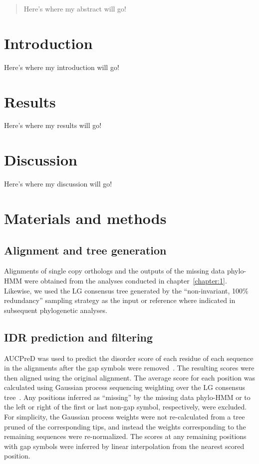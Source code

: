 \begin{abstract}
\noindent
Here's where my abstract will go!
\end{abstract}

\section{Introduction}
Here's where my introduction will go!

\section{Results}
Here's where my results will go!

\section{Discussion}
Here's where my discussion will go!

\section{Materials and methods}

\subsection{Alignment and tree generation}
Alignments of single copy orthologs and the outputs of the missing data phylo-HMM were obtained from the analyses conducted in chapter~\ref{chapter:1}. Likewise, we used the LG consensus tree generated by the ``non-invariant, 100\% redundancy'' sampling strategy as the input or reference where indicated in subsequent phylogenetic analyses.

\subsection{IDR prediction and filtering}
AUCPreD was used to predict the disorder score of each residue of each sequence in the alignments after the gap symbols were removed~\cite{Wang2016}. The resulting scores were then aligned using the original alignment. The average score for each position was calculated using Gaussian process sequencing weighting over the LG consensus tree~\cite{Altschul1989}. Any positions inferred as ``missing'' by the missing data phylo-HMM or to the left or right of the first or last non-gap symbol, respectively, were excluded. For simplicity, the Gaussian process weights were not re-calculated from a tree pruned of the corresponding tips, and instead the weights corresponding to the remaining sequences were re-normalized. The scores at any remaining positions with gap symbols were inferred by linear interpolation from the nearest scored position.

